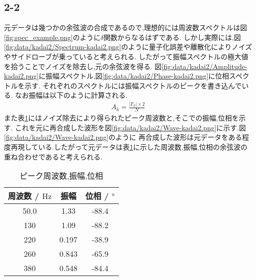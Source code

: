 \subsection*{2-2}
元データは幾つかの余弦波の合成であるので,理想的には周波数スペクトルは図\ref{fig:spec_example.png}のように$\delta$関数からなるはずである.
しかし実際には,図\ref{fig:data/kadai2/Spectrum-kadai2.png}のように量子化誤差や離散化によりノイズやサイドローブが乗っていると考えられる.
したがって振幅スペクトルの極大値を拾うことでノイズを除去し,元の余弦波を得る.
図\ref{fig:data/kadai2/Amplitude-kadai2.png}に振幅スペクトル,図\ref{fig:data/kadai2/Phase-kadai2.png}に位相スペクトルを示す.
それぞれのスペクトルには振幅スペクトルのピークを書き込んでいる.
なお振幅は以下のように計算される.
\begin{align*}
  A_k=\frac{|F_k|\times 2}{N}
\end{align*}
また表\ref{tab:2-2}にはノイズ除去により得られたピーク周波数と,そこでの振幅,位相を示す.
これを元に再合成した波形を図\ref{fig:data/kadai2/Wave-kadai2.png}に示す.図\ref{fig:data/kadai2/Wave-kadai2.png}のように
再合成した波形は元データをある程度再現している.したがって元データは表\ref{tab:2-2}に示した周波数,振幅,位相の余弦波の重ね合わせであると考えられる.
\begin{table}[h]
\caption{ピーク周波数,振幅,位相}
\label{tab:2-2}
\centering
\begin{tabular}{ccc}
\hline
周波数 / $\si{\hertz}$&振幅&位相 / $\si{\degree}$\\
\hline \hline
50.0&1.33&-88.4\\
130&1.09&-88.2\\
220&0.197&-38.9\\
260&0.843&-65.9\\
380&0.548&-84.4\\
\hline
\end{tabular}
\end{table}
